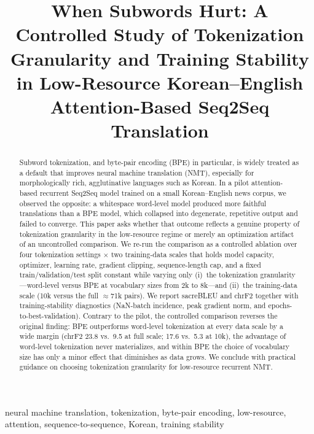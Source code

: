\documentclass[conference]{IEEEtran}
\begin{document}
\title{When Subwords Hurt: A Controlled Study of Tokenization
Granularity and Training Stability in Low-Resource
Korean--English Attention-Based Seq2Seq Translation}

\author{
}

\maketitle

\begin{abstract}
Subword tokenization, and byte-pair encoding (BPE) in particular, is widely
treated as a default that improves neural machine translation (NMT), especially
for morphologically rich, agglutinative languages such as Korean. In a pilot
attention-based recurrent Seq2Seq model trained on a small Korean--English news
corpus, we observed the opposite: a whitespace word-level model produced more
faithful translations than a BPE model, which collapsed into degenerate,
repetitive output and failed to converge. This paper asks whether that outcome
reflects a genuine property of tokenization granularity in the low-resource
regime or merely an optimization artifact of an uncontrolled comparison. We
re-run the comparison as a controlled ablation over four tokenization settings
$\times$ two training-data scales that holds model capacity, optimizer, learning
rate, gradient clipping, sequence-length cap, and a fixed train/validation/test
split constant while varying only (i)~the tokenization granularity---word-level
versus BPE at vocabulary sizes from 2k to 8k---and (ii)~the training-data scale
(10k versus the full $\approx$71k pairs). We report sacreBLEU and chrF2 together
with training-stability diagnostics (NaN-batch incidence, peak gradient norm, and
epochs-to-best-validation). Contrary to the pilot, the controlled comparison
reverses the original finding: BPE outperforms word-level tokenization at every
data scale by a wide margin (chrF2 23.8 vs.\ 9.5 at full scale; 17.6 vs.\ 5.3 at
10k), the advantage of word-level tokenization never materializes, and within
BPE the choice of vocabulary size has only a minor effect that diminishes as data
grows. We conclude with practical guidance on choosing tokenization granularity
for low-resource recurrent NMT.
\end{abstract}

\begin{IEEEkeywords}
neural machine translation, tokenization, byte-pair encoding, low-resource,
attention, sequence-to-sequence, Korean, training stability
\end{IEEEkeywords}
\end{document}
